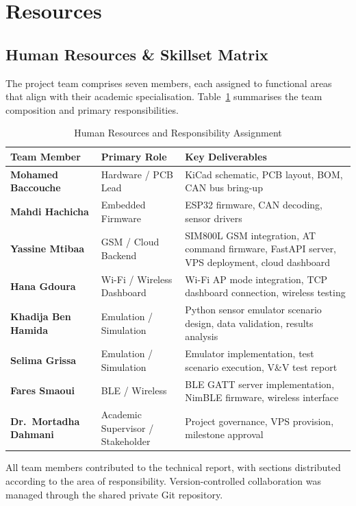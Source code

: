 \section{Resources}

\subsection{Human Resources \& Skillset Matrix}

The project team comprises seven members, each assigned to functional areas that align with their academic specialisation. Table~\ref{tab:human-resources} summarises the team composition and primary responsibilities.

\begin{table}[H]
\centering
\caption{Human Resources and Responsibility Assignment}
\label{tab:human-resources}
\small
\begin{tabular}{>{\bfseries}p{3.4cm} p{4.2cm} p{5.0cm}}
\toprule
Team Member & Primary Role & Key Deliverables \\
\midrule
Mohamed Baccouche  & Hardware / PCB Lead        & KiCad schematic, PCB layout, BOM, CAN bus bring-up \\
Mahdi Hachicha     & Embedded Firmware          & ESP32 firmware, CAN decoding, sensor drivers \\
Yassine Mtibaa     & GSM / Cloud Backend        & SIM800L GSM integration, AT command firmware, FastAPI server, VPS deployment, cloud dashboard \\
Hana Gdoura        & Wi-Fi / Wireless Dashboard & Wi-Fi AP mode integration, TCP dashboard connection, wireless testing \\
Khadija Ben Hamida & Emulation / Simulation     & Python sensor emulator scenario design, data validation, results analysis \\
Selima Grissa      & Emulation / Simulation     & Emulator implementation, test scenario execution, V\&V test report \\
Fares Smaoui       & BLE / Wireless             & BLE GATT server implementation, NimBLE firmware, wireless interface \\
\midrule
Dr.\ Mortadha Dahmani & Academic Supervisor / Stakeholder & Project governance, VPS provision, milestone approval \\
\bottomrule
\end{tabular}
\end{table}

All team members contributed to the technical report, with sections distributed according to the area of responsibility. Version-controlled collaboration was managed through the shared private Git repository.

